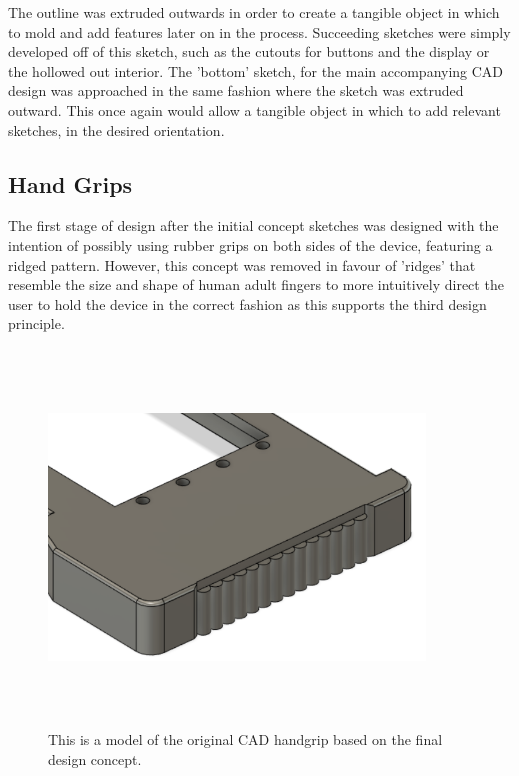 The outline was extruded outwards in order to create a tangible object in which to mold and add features later on in the process.
Succeeding sketches were simply developed off of this sketch, such as the cutouts for buttons and the display or the hollowed out interior.
The 'bottom' sketch, for the main accompanying CAD design was approached in the same fashion where the sketch was extruded outward.
This once again would allow a tangible object in which to add relevant sketches, in the desired orientation.

\subsection{Hand Grips}

The first stage of design after the initial concept sketches was designed with the intention of possibly using rubber grips on both sides of the device, featuring a ridged pattern.
However, this concept was removed in favour of 'ridges' that resemble the size and shape of human adult fingers to more intuitively direct the user to hold the device in the correct fashion as this supports the third design principle.

\begin{figure} [h]
    \centering
    \includegraphics[width=10cm,height=10cm,keepaspectratio]{Figures/handgrip_original.png}
    \caption{This is a model of the original CAD handgrip based on the final design concept.}
    \label{fig:Design_3}
\end{figure}

